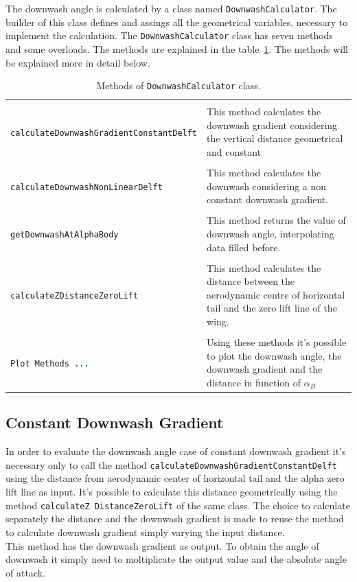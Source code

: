 The downwash angle is calculated by a class named \texttt{DownwashCalculator}. The builder of this class defines and assings all the geometrical variables, necessary to implement the calculation. The  \texttt{DownwashCalculator} class has seven methods and some overloads. The methods are explained in the table~\ref{table:Table1}. The methods will be explained more in detail below.

\begin{table}[H]
\begin{tabular}{p{7cm}p{7.5cm}}
\toprule
 \\[0.1	cm] 
\lstinline[language=Java]!calculateDownwashGradientConstantDelft! & This method calculates the downwash gradient  considering the vertical distance geometrical and constant\\ \hline \\[0.1	cm] 
\lstinline[language=Java]!calculateDownwashNonLinearDelft! &This method calculates the downwash considering a non constant downwash gradient.  \\ \hline \\ [0.1cm]
\lstinline[language=Java]!getDownwashAtAlphaBody! & This method returns the value of downwash angle, interpolating data filled before.\\ \hline \\[0.1cm]
\lstinline[language=Java]!calculateZDistanceZeroLift!	& This method calculates the distance between the aerodynamic centre of horizontal tail and the zero lift line of the wing. \\ \hline \\[0.1cm]
\lstinline[language=Java]!Plot Methods ...! & Using these methods it's possible to plot the downwash angle, the downwash gradient and the distance in function of $\alpha_{B}$ \\
\bottomrule
\end{tabular}
\caption{Methods of \texttt{DownwashCalculator} class.}
\label{table:Table1}
\end{table}


\subsection{Constant Downwash Gradient}
In order to evaluate the downwash angle case of constant downwash gradient it's necessary only to call the method \texttt{calculateDownwashGradientConstantDelft} using the distance from aerodynamic center of horizontal tail and the alpha zero lift line as input. It's possible to calculate this distance geometrically using the method \texttt{calculateZ DistanceZeroLift} of the same class. The choice to calculate separately the distance and the downwash gradient is made to reuse the method to calculate downwash gradient simply varying the input distance. \\ 
This method has the downwash gradient as output. To obtain the angle of downwash it simply need to moltiplicate the output value and the absolute angle of attack. 

